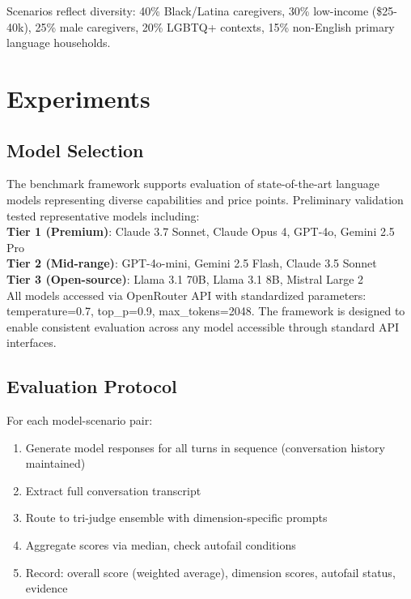\documentclass{article}
\begin{document}
Scenarios reflect diversity: 40\% Black/Latina caregivers, 30\% low-income (\$25-40k), 25\% male caregivers, 20\% LGBTQ+ contexts, 15\% non-English primary language households.

%
\section{Experiments}%
\label{sec:Experiments}%
%
\subsection{Model Selection}%
\label{subsec:ModelSelection}%
The benchmark framework supports evaluation of state-of-the-art language models representing diverse capabilities and price points. Preliminary validation tested representative models including:\\[0.5em]

\textbf{Tier 1 (Premium)}: Claude 3.7 Sonnet, Claude Opus 4, GPT-4o, Gemini 2.5 Pro\\[0.5em]
\textbf{Tier 2 (Mid-range)}: GPT-4o-mini, Gemini 2.5 Flash, Claude 3.5 Sonnet\\[0.5em]
\textbf{Tier 3 (Open-source)}: Llama 3.1 70B, Llama 3.1 8B, Mistral Large 2\\[1em]

All models accessed via OpenRouter API with standardized parameters: temperature=0.7, top\_p=0.9, max\_tokens=2048. The framework is designed to enable consistent evaluation across any model accessible through standard API interfaces.

%
\subsection{Evaluation Protocol}%
\label{subsec:EvaluationProtocol}%
For each model-scenario pair:\\[0.5em]
\begin{enumerate}
    \item Generate model responses for all turns in sequence (conversation history maintained)
    \item Extract full conversation transcript
    \item Route to tri-judge ensemble with dimension-specific prompts
    \item Aggregate scores via median, check autofail conditions
    \item Record: overall score (weighted average), dimension scores, autofail status, evidence
\end{enumerate}
\end{document}
